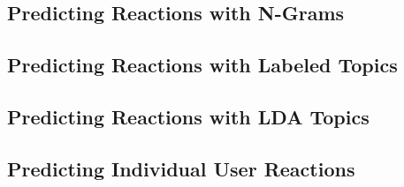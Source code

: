 
\subsection{Predicting Reactions with N-Grams}


\subsection{Predicting Reactions with Labeled Topics}


\subsection{Predicting Reactions with LDA Topics}


\subsection{Predicting Individual User Reactions}


